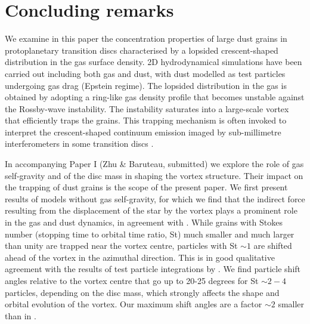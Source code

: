 \documentclass[a4paper,usenatbib]{mnras}
\begin{document}
\section{Concluding remarks}
\label{sec:conclusion}
We examine in this paper the concentration properties of large dust
grains in protoplanetary transition discs characterised by a lopsided
crescent-shaped distribution in the gas surface density. 2D
hydrodynamical simulations have been carried out including both gas
and dust, with dust modelled as test particles undergoing gas drag
(Epstein regime). The lopsided distribution in the gas is obtained by
adopting a ring-like gas density profile that becomes unstable against
the Rossby-wave instability.  The instability saturates into a
large-scale vortex that efficiently traps the grains. This trapping
mechanism is often invoked to interpret the crescent-shaped continuum
emission imaged by sub-millimetre interferometers in some transition
discs \citep[e.g.,][]{Regaly12}.

In accompanying Paper I (Zhu \& Baruteau, submitted) we explore the
role of gas self-gravity and of the disc mass in shaping the vortex
structure.  Their impact on the trapping of dust grains is the scope
of the present paper. We first present results of models without gas
self-gravity, for which we find that the indirect force resulting from
the displacement of the star by the vortex plays a prominent role in
the gas and dust dynamics, in agreement with \cite{MC15}.  While
grains with Stokes number (stopping time to orbital time ratio, St)
much smaller and much larger than unity are trapped near the vortex
centre, particles with St $\sim 1$ are shifted ahead of the vortex in
the azimuthal direction. This is in good qualitative agreement with
the results of test particle integrations by \cite{MC15}.  We find
particle shift angles relative to the vortex centre that go up to
20-25 degrees for St $\sim 2-4$ particles, depending on the disc mass,
which strongly affects the shape and orbital evolution of the vortex.
Our maximum shift angles are a factor $\sim 2$ smaller than in
\cite{MC15}.
\end{document}
